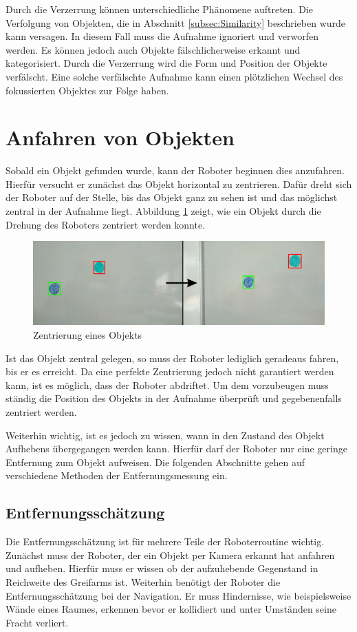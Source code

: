Durch die Verzerrung können unterschiedliche Phänomene auftreten. Die Verfolgung von Objekten, die in Abschnitt \ref{subsec:Similarity} beschrieben wurde kann versagen. In diesem Fall muss die Aufnahme ignoriert und verworfen werden. Es können jedoch auch Objekte fälschlicherweise erkannt und kategorisiert. Durch die Verzerrung wird die Form und Position der Objekte verfälscht. Eine solche verfälschte Aufnahme kann einen plötzlichen Wechsel des fokussierten Objektes zur Folge haben.

\section{Anfahren von Objekten}
\label{sec:Ansteuerung}

Sobald ein Objekt gefunden wurde, kann der Roboter beginnen dies anzufahren. Hierfür versucht er zunächst das Objekt horizontal zu zentrieren. Dafür dreht sich der Roboter auf der Stelle, bis das Objekt ganz zu sehen ist und das möglichst zentral in der Aufnahme liegt. Abbildung \ref{fig:Zentrierung} zeigt, wie ein Objekt durch die Drehung des Roboters zentriert werden konnte.

\begin{figure}[h]
\centering
\includegraphics[width=\textwidth]{Bilder/Workloop/Zentrierung}
\caption{Zentrierung eines Objekts}
\label{fig:Zentrierung}
\end{figure}

Ist das Objekt zentral gelegen, so muss der Roboter lediglich geradeaus fahren, bis er es erreicht. Da eine perfekte Zentrierung jedoch nicht garantiert werden kann, ist es möglich, dass der Roboter abdriftet. Um dem vorzubeugen muss ständig die Position des Objekts in der Aufnahme überprüft und gegebenenfalls zentriert werden.

Weiterhin wichtig, ist es jedoch zu wissen, wann in den Zustand des Objekt Aufhebens übergegangen werden kann. Hierfür darf der Roboter nur eine geringe Entfernung zum Objekt aufweisen. Die folgenden Abschnitte gehen auf verschiedene Methoden der Entfernungsmessung ein.

\subsection{Entfernungsschätzung}
\label{subsec:Entfernungsschätzung}
Die Entfernungsschätzung ist für mehrere Teile der Roboterroutine wichtig. Zunächst muss der Roboter, der ein Objekt per Kamera erkannt hat anfahren und aufheben. Hierfür muss er wissen ob der aufzuhebende Gegenstand in Reichweite des Greifarms ist. Weiterhin benötigt der Roboter die Entfernungsschätzung bei der Navigation. Er muss Hindernisse, wie beispielsweise Wände eines Raumes, erkennen bevor er kollidiert und unter Umständen seine Fracht verliert.

